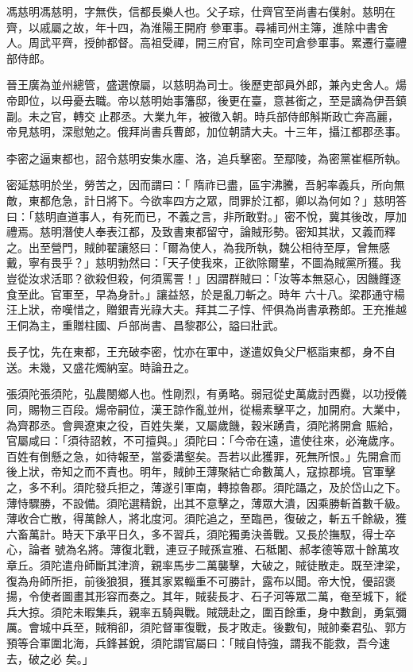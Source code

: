 \begin{pinyinscope}
 馮慈明馮慈明，字無佚，信都長樂人也。父子琮，仕齊官至尚書右僕射。慈明在齊，以戚屬之故，年十四，為淮陽王開府
 參軍事。尋補司州主簿，進除中書舍人。周武平齊，授帥都督。高祖受禪，開三府官，除司空司倉參軍事。累遷行臺禮部侍郎。



 晉王廣為並州總管，盛選僚屬，以慈明為司士。後歷吏部員外郎，兼內史舍人。煬帝即位，以母憂去職。帝以慈明始事籓邸，後更在臺，意甚銜之，至是謫為伊吾鎮副。未之官，轉交止郡丞。大業九年，被徵入朝。時兵部侍郎斛斯政亡奔高麗，帝見慈明，深慰勉之。俄拜尚書兵曹郎，加位朝請大夫。十三年，攝江都郡丞事。



 李密之逼東都也，詔令慈明安集水廛、洛，追兵擊密。至鄢陵，為密黨崔樞所執。



 密延慈明於坐，勞苦之，因而謂曰：「
 隋祚已盡，區宇沸騰，吾躬率義兵，所向無敵，東都危急，計日將下。今欲率四方之眾，問罪於江都，卿以為何如？」慈明答曰：「慈明直道事人，有死而已，不義之言，非所敢對。」密不悅，冀其後改，厚加禮焉。慈明潛使人奉表江都，及致書東都留守，論賊形勢。密知其狀，又義而釋之。出至營門，賊帥翟讓怒曰：「爾為使人，為我所執，魏公相待至厚，曾無感戴，寧有畏乎？」慈明勃然曰：「天子使我來，正欲除爾輩，不圖為賊黨所獲。我豈從汝求活耶？欲殺但殺，何須罵詈！」因謂群賊曰：「汝等本無惡心，因饑饉逐食至此。官軍至，早為身計。」讓益怒，於是亂刀斬之。時年
 六十八。梁郡通守楊汪上狀，帝嘆惜之，贈銀青光祿大夫。拜其二子惇、怦俱為尚書承務郎。王充推越王侗為主，重贈柱國、戶部尚書、昌黎郡公，謚曰壯武。



 長子忱，先在東都，王充破李密，忱亦在軍中，遂遣奴負父尸柩詣東都，身不自送。未幾，又盛花燭納室。時論丑之。



 張須陀張須陀，弘農閿鄉人也。性剛烈，有勇略。弱冠從史萬歲討西爨，以功授儀同，賜物三百段。煬帝嗣位，漢王諒作亂並州，從楊素擊平之，加開府。大業中，為齊郡丞。會興遼東之役，百姓失業，又屬歲饑，穀米踴貴，須陀將開倉
 賑給，官屬咸曰：「須待詔敕，不可擅與。」須陀曰：「今帝在遠，遣使往來，必淹歲序。百姓有倒懸之急，如待報至，當委溝壑矣。吾若以此獲罪，死無所恨。」先開倉而後上狀，帝知之而不責也。明年，賊帥王薄聚結亡命數萬人，寇掠郡境。官軍擊之，多不利。須陀發兵拒之，薄遂引軍南，轉掠魯郡。須陀躡之，及於岱山之下。薄恃驟勝，不設備。須陀選精銳，出其不意擊之，薄眾大潰，因乘勝斬首數千級。薄收合亡散，得萬餘人，將北度河。須陀追之，至臨邑，復破之，斬五千餘級，獲六畜萬計。時天下承平日久，多不習兵，須陀獨勇決善戰。又長於撫馭，得士卒心，論者
 號為名將。薄復北戰，連豆子賊孫宣雅、石秪闍、郝孝德等眾十餘萬攻章丘。須陀遣舟師斷其津濟，親率馬步二萬襲擊，大破之，賊徒散走。既至津梁，復為舟師所拒，前後狼狽，獲其家累輜重不可勝計，露布以聞。帝大悅，優詔褒揚，令使者圖畫其形容而奏之。其年，賊裴長才、石子河等眾二萬，奄至城下，縱兵大掠。須陀未暇集兵，親率五騎與戰。賊競赴之，圍百餘重，身中數創，勇氣彌厲。會城中兵至，賊稍卻，須陀督軍復戰，長才敗走。後數旬，賊帥秦君弘、郭方預等合軍圍北海，兵鋒甚銳，須陀謂官屬曰：「賊自恃強，謂我不能救，吾今速去，破之必
 矣。」




\end{pinyinscope}
